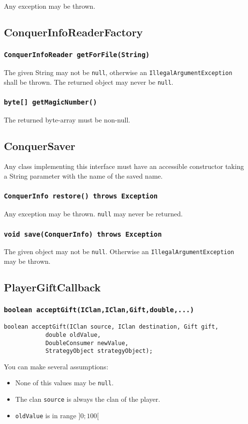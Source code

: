 \documentclass{article}
\begin{document}
Any exception may be thrown. 

\subsection{ConquerInfoReaderFactory}

\subsubsection{\texttt{ConquerInfoReader getForFile(String)}}

The given String may not be \texttt{null}, otherwise an \texttt{IllegalArgumentException} shall be thrown.
The returned object may never be \texttt{null}.

\subsubsection{\texttt{byte[] getMagicNumber()}}
The returned byte-array must be non-null.

\subsection{ConquerSaver}

Any class implementing this interface must have an accessible constructor taking a String parameter
with the name of the saved name.

\subsubsection{\texttt{ConquerInfo restore() throws Exception}}
Any exception may be thrown. \texttt{null} may never be returned.

\subsubsection{\texttt{void save(ConquerInfo) throws Exception}}
The given object may not be \texttt{null}. Otherwise an \texttt{IllegalArgumentException} may be thrown.

\subsection{PlayerGiftCallback}

\subsubsection{\texttt{boolean acceptGift(IClan,IClan,Gift,double,...)}}
\begin{verbatim}
boolean acceptGift(IClan source, IClan destination, Gift gift,
			double oldValue,
			DoubleConsumer newValue,
			StrategyObject strategyObject);
\end{verbatim}
You can make several assumptions:
\begin{itemize}
	\item None of this values may be \texttt{null}.
	\item The clan \texttt{source} is always the clan of the player.
	\item \texttt{oldValue} is in range $]0;100[$
\end{itemize}
\end{document}
